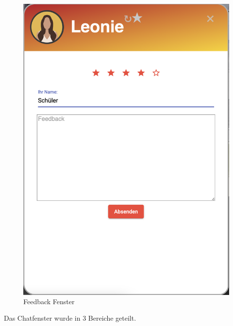 \begin{figure}[hbt!]
    \centering
    \includegraphics[scale=0.2]{pics/feedback}
    \caption{Feedback Fenster}
    \label{fig:impl:feedback}
\end{figure}

Das Chatfenster wurde in 3 Bereiche geteilt.

